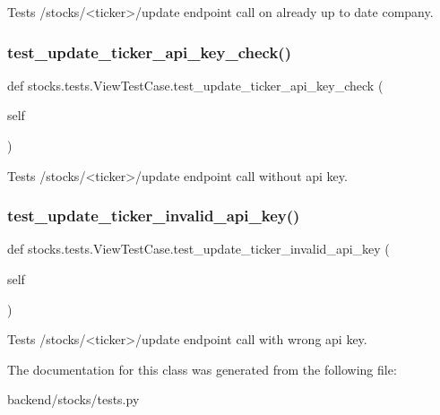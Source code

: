 \begin{DoxyVerb}Tests /stocks/<ticker>/update endpoint call on already
up to date company.
\end{DoxyVerb}
 \mbox{\label{classstocks_1_1tests_1_1_view_test_case_a61c3bdc301ef40c84704d8b2630d62bb}} 
\subsubsection{\texorpdfstring{test\+\_\+update\+\_\+ticker\+\_\+api\+\_\+key\+\_\+check()}{test\_update\_ticker\_api\_key\_check()}}
{\footnotesize\ttfamily def stocks.\+tests.\+View\+Test\+Case.\+test\+\_\+update\+\_\+ticker\+\_\+api\+\_\+key\+\_\+check (\begin{DoxyParamCaption}\item[{}]{self }\end{DoxyParamCaption})}

\begin{DoxyVerb}Tests /stocks/<ticker>/update endpoint call without api key.
\end{DoxyVerb}
 \mbox{\label{classstocks_1_1tests_1_1_view_test_case_ad0f6d1743dfa3ee2e681000b9246b892}} 
\subsubsection{\texorpdfstring{test\+\_\+update\+\_\+ticker\+\_\+invalid\+\_\+api\+\_\+key()}{test\_update\_ticker\_invalid\_api\_key()}}
{\footnotesize\ttfamily def stocks.\+tests.\+View\+Test\+Case.\+test\+\_\+update\+\_\+ticker\+\_\+invalid\+\_\+api\+\_\+key (\begin{DoxyParamCaption}\item[{}]{self }\end{DoxyParamCaption})}

\begin{DoxyVerb}Tests /stocks/<ticker>/update endpoint call with wrong api key.
\end{DoxyVerb}
 

The documentation for this class was generated from the following file\+:\begin{DoxyCompactItemize}
\item 
backend/stocks/tests.\+py\end{DoxyCompactItemize}
